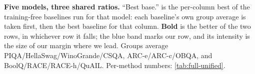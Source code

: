 \begin{table}[t]
\centering
\caption{\textbf{Five models, three shared ratios.} ``Best base.'' is the per-column best of the
training-free baselines run for that model: each baseline's own group average is taken first, then
the best baseline for that column. \textbf{Bold} is the better of the two rows, in whichever row it
falls; the blue band marks our row, and its intensity is the size of our margin where we lead. Groups
average PIQA/HellaSwag/WinoGrande/CSQA, ARC-e/ARC-c/OBQA, and BoolQ/RACE/RACE-h/QuAIL. Per-method
numbers: \cref{tab:full-unified}.}
\label{tab:cross-model}
{\small}
\end{table}
